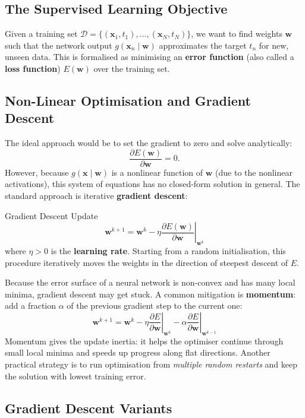 \documentclass[11pt,a4paper]{article}
\newcommand{\term}[1]{\textcolor{DefGreen}{\textbf{#1}}}
\begin{document}
\subsection{The Supervised Learning Objective}

Given a training set $\mathcal{D} = \{(\mathbf{x}_1, t_1), \ldots, (\mathbf{x}_N, t_N)\}$, we want to find weights $\mathbf{w}$ such that the network output $g(\mathbf{x}_n \mid \mathbf{w})$ approximates the target $t_n$ for new, unseen data. This is formalised as minimising an \term{error function} (also called a \term{loss function}) $E(\mathbf{w})$ over the training set.

\subsection{Non-Linear Optimisation and Gradient Descent}

The ideal approach would be to set the gradient to zero and solve analytically:
\[
\frac{\partial E(\mathbf{w})}{\partial \mathbf{w}} = 0.
\]
However, because $g(\mathbf{x} \mid \mathbf{w})$ is a nonlinear function of $\mathbf{w}$ (due to the nonlinear activations), this system of equations has no closed-form solution in general. The standard approach is iterative \term{gradient descent}:

\begin{defbox}{Gradient Descent Update}
\[
\mathbf{w}^{k+1} = \mathbf{w}^k - \eta \left.\frac{\partial E(\mathbf{w})}{\partial \mathbf{w}}\right|_{\mathbf{w}^k}
\]
where $\eta > 0$ is the \term{learning rate}. Starting from a random initialisation, this procedure iteratively moves the weights in the direction of steepest descent of $E$.
\end{defbox}

Because the error surface of a neural network is non-convex and has many local minima, gradient descent may get stuck. A common mitigation is \term{momentum}: add a fraction $\alpha$ of the previous gradient step to the current one:
\[
\mathbf{w}^{k+1} = \mathbf{w}^k - \eta \left.\frac{\partial E}{\partial \mathbf{w}}\right|_{\mathbf{w}^k} - \alpha \left.\frac{\partial E}{\partial \mathbf{w}}\right|_{\mathbf{w}^{k-1}}
\]
Momentum gives the update inertia: it helps the optimiser continue through small local minima and speeds up progress along flat directions. Another practical strategy is to run optimisation from \emph{multiple random restarts} and keep the solution with lowest training error.

\subsection{Gradient Descent Variants}
\end{document}

